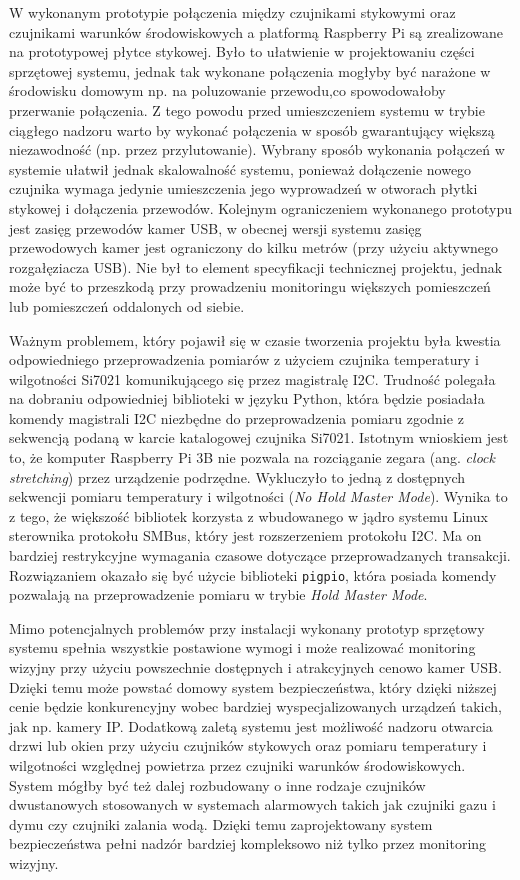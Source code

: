 \documentclass[a4paper,11pt,twoside]{article}
\begin{document}
W wykonanym prototypie połączenia między czujnikami stykowymi oraz czujnikami warunków środowiskowych a platformą Raspberry Pi są zrealizowane na prototypowej płytce stykowej. Było to ułatwienie w projektowaniu części sprzętowej systemu, jednak tak wykonane połączenia mogłyby być narażone w środowisku domowym np. na poluzowanie przewodu,co spowodowałoby przerwanie połączenia. Z tego powodu przed umieszczeniem systemu w trybie ciągłego nadzoru warto by wykonać połączenia w sposób gwarantujący większą niezawodność (np. przez przylutowanie). Wybrany sposób wykonania połączeń w systemie ułatwił jednak skalowalność systemu, ponieważ dołączenie nowego czujnika wymaga jedynie umieszczenia jego wyprowadzeń w otworach płytki stykowej i dołączenia przewodów. Kolejnym ograniczeniem wykonanego prototypu jest zasięg przewodów kamer USB, w obecnej wersji systemu zasięg przewodowych kamer jest ograniczony do kilku metrów (przy użyciu aktywnego rozgałęziacza USB). Nie był to element specyfikacji technicznej projektu, jednak może być to przeszkodą przy prowadzeniu monitoringu większych pomieszczeń lub pomieszczeń oddalonych od siebie.

Ważnym problemem, który pojawił się w czasie tworzenia projektu była kwestia odpowiedniego przeprowadzenia pomiarów z użyciem czujnika temperatury i wilgotności Si7021 komunikującego się przez magistralę I2C. Trudność polegała na dobraniu odpowiedniej biblioteki w języku Python, która będzie posiadała komendy magistrali I2C niezbędne do przeprowadzenia pomiaru zgodnie z sekwencją podaną w karcie katalogowej czujnika Si7021. Istotnym wnioskiem jest to, że komputer Raspberry Pi 3B nie pozwala na rozciąganie zegara (ang. \textit{clock stretching}) przez urządzenie podrzędne. Wykluczyło to jedną z dostępnych sekwencji pomiaru temperatury i wilgotności (\textit{No Hold Master Mode}). Wynika to z tego, że większość bibliotek korzysta z wbudowanego w jądro systemu Linux sterownika protokołu SMBus, który jest rozszerzeniem protokołu I2C. Ma on bardziej restrykcyjne wymagania czasowe dotyczące przeprowadzanych transakcji. Rozwiązaniem okazało się być użycie biblioteki \texttt{pigpio}, która posiada komendy pozwalają na przeprowadzenie pomiaru w trybie \textit{Hold Master Mode}.

Mimo potencjalnych problemów przy instalacji wykonany prototyp sprzętowy systemu spełnia wszystkie postawione wymogi i może realizować monitoring wizyjny przy użyciu powszechnie dostępnych i atrakcyjnych cenowo kamer USB. Dzięki temu może powstać domowy system bezpieczeństwa, który dzięki niższej cenie będzie konkurencyjny wobec bardziej wyspecjalizowanych urządzeń takich, jak np. kamery IP. Dodatkową zaletą systemu jest możliwość nadzoru otwarcia drzwi lub okien przy użyciu czujników stykowych oraz pomiaru temperatury i wilgotności względnej powietrza przez czujniki warunków środowiskowych. System mógłby być też dalej rozbudowany o inne rodzaje czujników dwustanowych stosowanych w systemach alarmowych takich jak czujniki gazu i dymu czy czujniki zalania wodą. Dzięki temu zaprojektowany system bezpieczeństwa pełni nadzór bardziej kompleksowo niż tylko przez monitoring wizyjny.
\end{document}

